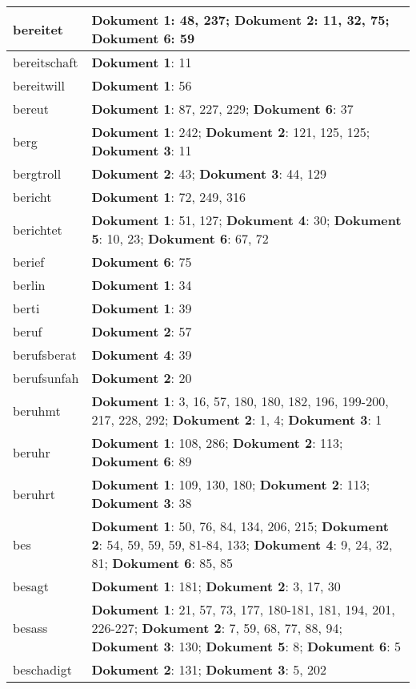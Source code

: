 \documentclass[a5paper]{article}
\begin{document}
\begin{longtable}[l]{|l|p{3in}|}
\hline
bereitet & \textbf{Dokument 1}: 48, 237; \textbf{Dokument 2}: 11, 32, 75; \textbf{Dokument 6}: 59 \\
\hline
bereitschaft & \textbf{Dokument 1}: 11 \\
\hline
bereitwill & \textbf{Dokument 1}: 56 \\
\hline
bereut & \textbf{Dokument 1}: 87, 227, 229; \textbf{Dokument 6}: 37 \\
\hline
berg & \textbf{Dokument 1}: 242; \textbf{Dokument 2}: 121, 125, 125; \textbf{Dokument 3}: 11 \\
\hline
bergtroll & \textbf{Dokument 2}: 43; \textbf{Dokument 3}: 44, 129 \\
\hline
bericht & \textbf{Dokument 1}: 72, 249, 316 \\
\hline
berichtet & \textbf{Dokument 1}: 51, 127; \textbf{Dokument 4}: 30; \textbf{Dokument 5}: 10, 23; \textbf{Dokument 6}: 67, 72 \\
\hline
berief & \textbf{Dokument 6}: 75 \\
\hline
berlin & \textbf{Dokument 1}: 34 \\
\hline
berti & \textbf{Dokument 1}: 39 \\
\hline
beruf & \textbf{Dokument 2}: 57 \\
\hline
berufsberat & \textbf{Dokument 4}: 39 \\
\hline
berufsunfah & \textbf{Dokument 2}: 20 \\
\hline
beruhmt & \textbf{Dokument 1}: 3, 16, 57, 180, 180, 182, 196, 199-200, 217, 228, 292; \textbf{Dokument 2}: 1, 4; \textbf{Dokument 3}: 1 \\
\hline
beruhr & \textbf{Dokument 1}: 108, 286; \textbf{Dokument 2}: 113; \textbf{Dokument 6}: 89 \\
\hline
beruhrt & \textbf{Dokument 1}: 109, 130, 180; \textbf{Dokument 2}: 113; \textbf{Dokument 3}: 38 \\
\hline
bes & \textbf{Dokument 1}: 50, 76, 84, 134, 206, 215; \textbf{Dokument 2}: 54, 59, 59, 59, 81-84, 133; \textbf{Dokument 4}: 9, 24, 32, 81; \textbf{Dokument 6}: 85, 85 \\
\hline
besagt & \textbf{Dokument 1}: 181; \textbf{Dokument 2}: 3, 17, 30 \\
\hline
besass & \textbf{Dokument 1}: 21, 57, 73, 177, 180-181, 181, 194, 201, 226-227; \textbf{Dokument 2}: 7, 59, 68, 77, 88, 94; \textbf{Dokument 3}: 130; \textbf{Dokument 5}: 8; \textbf{Dokument 6}: 5 \\
\hline
beschadigt & \textbf{Dokument 2}: 131; \textbf{Dokument 3}: 5, 202 \\

\end{longtable}
\end{document}
